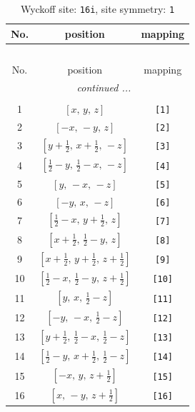 \documentclass[fleqn,8pt]{jsarticle}
\begin{document}
\begin{longtable}{ccc}
\caption{Wyckoff site: {\tt 16i}, site symmetry: {\tt 1}}
 \\
 \hline \hline
No. & position & mapping \\ \hline \endfirsthead

\multicolumn{2}{l}{\tablename\ \thetable{}} \\
 \hline \hline
No. & position & mapping \\ \hline \endhead

 \hline \hline
\multicolumn{2}{r}{\footnotesize\it continued ...} \\ \endfoot

 \hline \hline
\multicolumn{2}{r}{} \\ \endlastfoot

1 & $\left[ x,\, y,\, z \right]$ & {\tt [1]} \\ \hline
2 & $\left[ - x,\, - y,\, z \right]$ & {\tt [2]} \\ \hline
3 & $\left[ y + \frac{1}{2},\, x + \frac{1}{2},\, - z \right]$ & {\tt [3]} \\ \hline
4 & $\left[ \frac{1}{2} - y,\, \frac{1}{2} - x,\, - z \right]$ & {\tt [4]} \\ \hline
5 & $\left[ y,\, - x,\, - z \right]$ & {\tt [5]} \\ \hline
6 & $\left[ - y,\, x,\, - z \right]$ & {\tt [6]} \\ \hline
7 & $\left[ \frac{1}{2} - x,\, y + \frac{1}{2},\, z \right]$ & {\tt [7]} \\ \hline
8 & $\left[ x + \frac{1}{2},\, \frac{1}{2} - y,\, z \right]$ & {\tt [8]} \\ \hline
9 & $\left[ x + \frac{1}{2},\, y + \frac{1}{2},\, z + \frac{1}{2} \right]$ & {\tt [9]} \\ \hline
10 & $\left[ \frac{1}{2} - x,\, \frac{1}{2} - y,\, z + \frac{1}{2} \right]$ & {\tt [10]} \\ \hline
11 & $\left[ y,\, x,\, \frac{1}{2} - z \right]$ & {\tt [11]} \\ \hline
12 & $\left[ - y,\, - x,\, \frac{1}{2} - z \right]$ & {\tt [12]} \\ \hline
13 & $\left[ y + \frac{1}{2},\, \frac{1}{2} - x,\, \frac{1}{2} - z \right]$ & {\tt [13]} \\ \hline
14 & $\left[ \frac{1}{2} - y,\, x + \frac{1}{2},\, \frac{1}{2} - z \right]$ & {\tt [14]} \\ \hline
15 & $\left[ - x,\, y,\, z + \frac{1}{2} \right]$ & {\tt [15]} \\ \hline
16 & $\left[ x,\, - y,\, z + \frac{1}{2} \right]$ & {\tt [16]} \\
\end{longtable}
\end{document}
